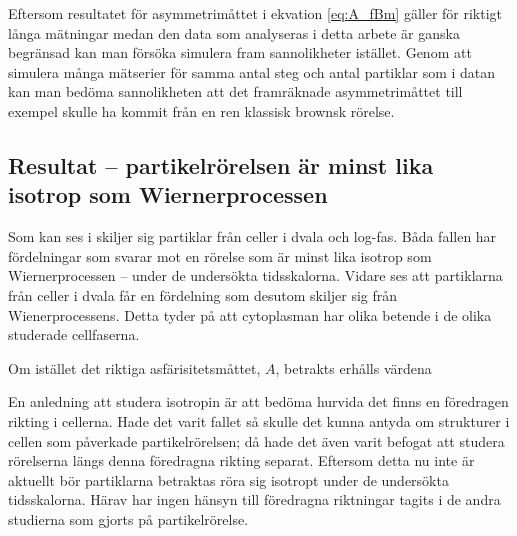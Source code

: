 Eftersom resultatet för asymmetrimåttet i ekvation \eqref{eq:A_fBm} gäller för riktigt långa mätningar medan den data som analyseras i detta arbete är ganska begränsad kan man försöka simulera fram sannolikheter istället. Genom att simulera många mätserier för samma antal steg och antal partiklar som i datan kan man bedöma sannolikheten att det framräknade asymmetrimåttet till exempel skulle ha kommit från en ren klassisk brownsk rörelse. 


\subsection{Resultat -- partikelrörelsen är minst lika isotrop som Wiernerprocessen}
Som kan ses i  skiljer sig partiklar från celler i dvala och log-fas. Båda fallen har fördelningar som svarar mot en rörelse som är minst lika isotrop som Wiernerprocessen -- under de undersökta tidsskalorna. Vidare ses att partiklarna från celler i dvala får en fördelning som desutom skiljer sig från Wienerprocessens. Detta tyder på att cytoplasman har olika betende i de olika studerade cellfaserna. 

Om istället det riktiga asfärisitetsmåttet, $A$, betrakts erhålls värdena 


En anledning att studera isotropin är att bedöma hurvida det finns en föredragen rikting i cellerna. Hade det varit fallet så skulle det kunna antyda om strukturer i cellen som påverkade partikelrörelsen; då hade det även varit befogat att studera rörelserna längs denna föredragna rikting separat. Eftersom detta nu inte är aktuellt bör partiklarna betraktas röra sig isotropt under de undersökta tidsskalorna. Härav har ingen hänsyn till föredragna riktningar tagits i de andra studierna som gjorts på partikelrörelse. 




\begin{comment}
\begin{table}[]
\centering
\begin{tabular}{|c|c|c|c|}
\hline
     &  Log-fas & Dvala & fBm\\ \hline
    $A$  & 0,41 & 0,49 & \\ \hline
\end{tabular}
\caption{Caption}
\label{tab:asp_values}
\end{table}
\end{comment}

